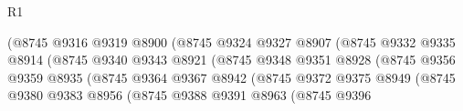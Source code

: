 \begin{lexlean}{R1}
\begin{coremodule}
                                              (@8745
                                                @9316
                                                @9319
                                                @8900
                                                (@8745
                                                  @9324
                                                  @9327
                                                  @8907
                                                  (@8745
                                                    @9332
                                                    @9335
                                                    @8914
                                                    (@8745
                                                      @9340
                                                      @9343
                                                      @8921
                                                      (@8745
                                                        @9348
                                                        @9351
                                                        @8928
                                                        (@8745
                                                          @9356
                                                          @9359
                                                          @8935
                                                          (@8745
                                                            @9364
                                                            @9367
                                                            @8942
                                                            (@8745
                                                              @9372
                                                              @9375
                                                              @8949
                                                              (@8745
                                                                @9380
                                                                @9383
                                                                @8956
                                                                (@8745
                                                                  @9388
                                                                  @9391
                                                                  @8963
                                                                  (@8745
                                                                    @9396

\end{coremodule}
\end{lexlean}
